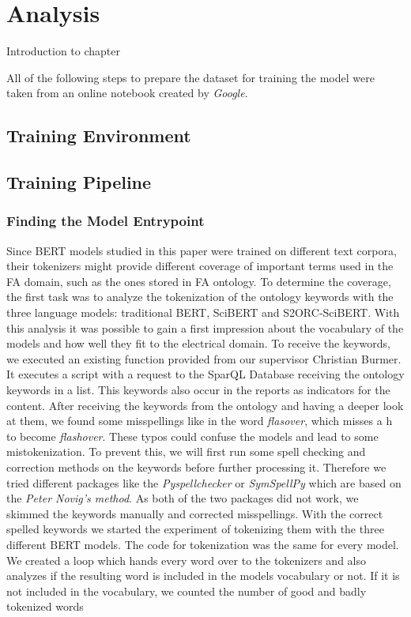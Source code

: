\chapter{Analysis} \label{chapter:analysis}
Introduction to chapter


All of the following steps to prepare the dataset for training the model were taken from an online \alert{notebook} created by \textit{Google}. 

\section{Training Environment}

\section{Training Pipeline}

\subsection{Finding the Model Entrypoint}
Since BERT models studied in this paper were trained on different text corpora, their tokenizers might provide different coverage of important terms used in the FA domain, such as the ones stored in FA ontology. To determine the coverage, the first task was to analyze the tokenization of the ontology keywords with the three language models: traditional BERT, SciBERT and S2ORC-SciBERT. With this analysis it was possible to gain a first impression about the vocabulary of the models and how well they fit to the electrical domain. \newline
To receive the keywords, we executed an existing function provided from our supervisor Christian Burmer. It executes a script with a request to the SparQL Database receiving the ontology keywords in a list. This keywords also occur in the reports as indicators for the content. \newline
After receiving the keywords from the ontology and having a deeper look at them, we found some misspellings like in the word \textit{flasover}, which misses a h to become \textit{flashover}. These typos could confuse the models and lead to some mistokenization. To prevent this, we will first run some spell checking and correction methods on the keywords before further processing it. Therefore we tried different packages like the \textit{Pyspellchecker} or \textit{SymSpellPy} which are based on the \textit{Peter Novig's method}. As both of the two packages did not work, we skimmed the keywords manually and corrected misspellings. \newline
With the correct spelled keywords we started the experiment of tokenizing them with the three different BERT models. The code for tokenization was the same for every model. We created a loop which hands every word over to the tokenizers and also analyzes if the resulting word is included in the models vocabulary or not. If it is not included in the vocabulary, we counted the number of good and badly tokenized words

